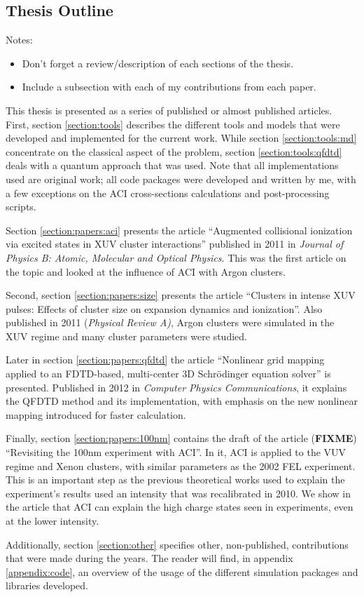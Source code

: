 \cite{Young2010,Chapman2011}


\subsection{Thesis Outline}
Notes:
\begin{itemize}
\item Don't forget a review/description of each sections of the thesis.
\item Include a subsection with each of my contributions from each paper.
\end{itemize}

This thesis is presented as a series of published or almost published articles.
First, section \ref{section:tools} describes the different tools and models
that were developed and implemented for the current work. While section
\ref{section:tools:md} concentrate on the classical aspect of the problem,
section \ref{section:tools:qfdtd} deals with a quantum approach that was
used. Note that all implementations used are original work; all code packages
were developed and written by me, with a few exceptions on the ACI
cross-sections calculations and post-processing scripts.

Section \ref{section:papers:aci} presents the article ``Augmented collisional
ionization via excited states in XUV cluster interactions'' published in 2011
in \textit{Journal of Physics B: Atomic, Molecular and Optical Physics}. This
was the first article on the topic and looked at the influence of ACI with Argon
clusters.

Second, section \ref{section:papers:size} presents the article ``Clusters in
intense XUV pulses: Effects of cluster size on expansion dynamics and
ionization''. Also published in 2011 (\textit{Physical Review A)}, Argon
clusters were simulated in the XUV regime and many cluster parameters were
studied.

Later in section \ref{section:papers:qfdtd} the article ``Nonlinear grid mapping
applied to an FDTD-based, multi-center 3D Schr\"odinger equation solver'' is
presented. Published in 2012 in \textit{Computer Physics Communications}, it
explains the QFDTD method and its implementation, with emphasis on the new
nonlinear mapping introduced for faster calculation.

Finally, section \ref{section:papers:100nm} contains the draft of the article
(\textbf{FIXME}) ``Revisiting the 100nm experiment with ACI''. In it, ACI is
applied to the VUV regime and Xenon clusters, with similar parameters as the 2002
FEL experiment. This is an important step as the previous theoretical works
used to explain the experiment's results used an intensity that was
recalibrated in 2010. We show in the article that ACI can explain the high
charge states seen in experiments, even at the lower intensity.

Additionally, section \ref{section:other} specifies other, non-published,
contributions that were made during the years. The reader will find, in appendix
\ref{appendix:code}, an overview of the usage of the different simulation
packages and libraries developed.




